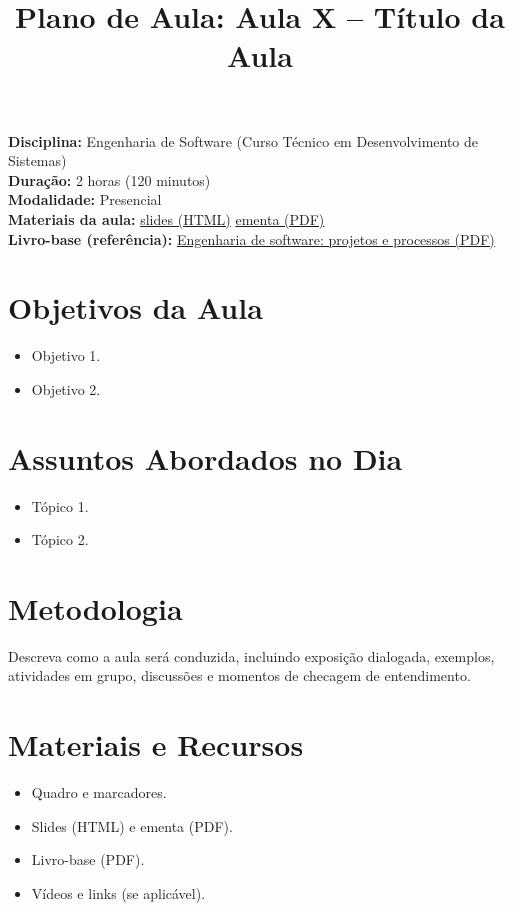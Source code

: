 \documentclass[12pt,a4paper]{article}
\title{Plano de Aula: Aula X -- Título da Aula}
\date{}
\begin{document}
\maketitle

\noindent
\textbf{Disciplina:} Engenharia de Software (Curso Técnico em Desenvolvimento de Sistemas)\\
\textbf{Duração:} 2 horas (120 minutos)\\
\textbf{Modalidade:} Presencial\\
\textbf{Materiais da aula:} \href{aula-0X.html}{slides (HTML)} \quad \href{aula-0X.pdf}{ementa (PDF)}\\
\textbf{Livro-base (referência):} \href{../99-Materiais/Engenharia%20de%20software%20projetos%20e%20processos%20by%20Wilson%20de%20P%C3%A1dua%20Paula%20Filho%20.epub.pdf}{Engenharia de software: projetos e processos (PDF)}

\section{Objetivos da Aula}
\begin{itemize}[leftmargin=*,itemsep=0.25em]
  \item Objetivo 1.
  \item Objetivo 2.
\end{itemize}

\section{Assuntos Abordados no Dia}
\begin{itemize}[leftmargin=*,itemsep=0.25em]
  \item Tópico 1.
  \item Tópico 2.
\end{itemize}

\section{Metodologia}
Descreva como a aula será conduzida, incluindo exposição dialogada, exemplos, atividades em grupo, discussões e momentos de checagem de entendimento.

\section{Materiais e Recursos}
\begin{itemize}[leftmargin=*,itemsep=0.25em]
  \item Quadro e marcadores.
  \item Slides (HTML) e ementa (PDF).
  \item Livro-base (PDF).
  \item Vídeos e links (se aplicável).
\end{itemize}
\end{document}
